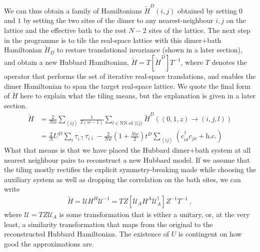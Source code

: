 \documentclass{report}
\numberwithin{equation}{section}
\begin{document}
{\begin{figure}[htpb]
 	\label{dimer-bath} 
 \end{figure}
 We  can thus obtain a family of Hamiltonians \(\tilde H^D(i,j)\) obtained by setting \(0\) and \(1\) by setting the two sites of the dimer to any nearest-neighbour \(i,j\) on the lattice and the effective bath to the rest \(N-2\) sites of the lattice. The next step in the programme is to tile the real-space lattice with this dimer+bath Hamiltonian \(\tilde H_D\) to restore translational invariance (shown in a later section), and obtain a new Hubbard Hamiltonian, $\tilde H = T\left[ \tilde H^{D} \right] T^{-1}$, where $T$ denotes the operator that performs the set of iterative real-space translations, and enables the dimer Hamiltonian to span the target real-space lattice. We quote the final form of $\tilde H$ here to explain what the tiling means, but the explanation is given in a later section.
 \begin{equation}\begin{aligned}
 	\tilde H &= \frac{2}{Nw}\sum_{\left<ij\right>}\frac{1}{2(w-1)}\sum_{l \in \text{NN of (i,j)}}\tilde H^D((0,1,z) \to (i, j, l))\\
 		 &= \frac{2}{N}U^D\sum_{i} \tau_{i \uparrow}\tau_{i \downarrow} - \frac{2}{Nw}\left(1 + \frac{Nw}{2}\right)t^D\sum_{\left<ij\right>}\left(c^\dagger_{i\sigma}c_{j\sigma} + \text{h.c.}\right)
 \end{aligned}\end{equation}
 What that means is that we have placed the Hubbard dimer+bath system at all nearest neighbour pairs to reconstruct a new Hubbard model. If we assume that the tiling mostly rectifies the explicit symmetry-breaking made while choosing the auxiliary system as well as dropping the correlation on the bath sites, we can write
 \begin{equation}\begin{aligned}
 	\tilde H = \mathcal{U} H^H \mathcal{U}^{-1} = TZ\left[\mathcal{U}_A H^A \mathcal{U}_A^\dagger \right]Z^{-1} T^{-1}~,
 \end{aligned}\end{equation}
 where $\mathcal{U} = TZ\mathcal{U}_{A}$ is some transformation that is either a unitary, or, at the very least, a similarity transformation that maps from the original to the reconstructed Hubbard Hamiltonian. 
 The existence of $U$ is contingent on how good the approximations are.
 
}
\end{document}
